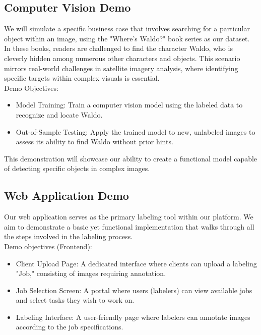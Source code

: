 \documentclass{article}
\begin{document}
\subsection{Computer Vision Demo}

We will simulate a specific business case that involves searching for a particular object within an image, using the "Where's Waldo?" book series as our dataset. In these books, readers are challenged to find the character Waldo, who is cleverly hidden among numerous other characters and objects. This scenario mirrors real-world challenges in satellite imagery analysis, where identifying specific targets within complex visuals is essential.\\

Demo Objectives:

\begin{itemize}
    \item Model Training: Train a computer vision model using the labeled data to recognize and locate Waldo.
    \item Out-of-Sample Testing: Apply the trained model to new, unlabeled images to assess its ability to find Waldo without prior hints.
\end{itemize}

This demonstration will showcase our ability to create a functional model capable of detecting specific objects in complex images.\\

\subsection{Web Application Demo}

Our web application serves as the primary labeling tool within our platform. We aim to demonstrate a basic yet functional implementation that walks through all the steps involved in the labeling process.\\

Demo objectives (Frontend):

\begin{itemize}
    \item Client Upload Page: A dedicated interface where clients can upload a labeling "Job," consisting of images requiring annotation.
    \item Job Selection Screen: A portal where users (labelers) can view available jobs and select tasks they wish to work on.
    \item Labeling Interface: A user-friendly page where labelers can annotate images according to the job specifications.
\end{itemize}
\end{document}
